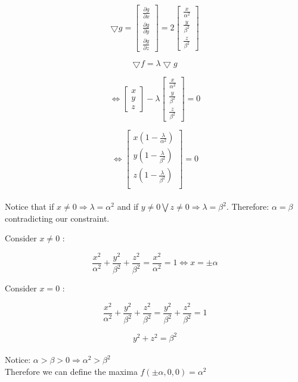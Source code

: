 \documentclass[12pt]{article}
\begin{document}
$$
\bigtriangledown g = 
\begin{bmatrix}
\frac{\partial g}{\partial x} \\
\frac{\partial g}{\partial y} \\
\frac{\partial g}{\partial z} 
\end{bmatrix} = 2
\begin{bmatrix}
\frac{x}{\alpha^2} \\
\frac{y}{\beta^2} \\
\frac{z}{\beta^2}
\end{bmatrix}
 $$

$$
\bigtriangledown f  = \lambda\bigtriangledown g
$$

$$
\iff \begin{bmatrix}
x \\
y \\
z
\end{bmatrix}
- \lambda
\begin{bmatrix}
\frac{x}{\alpha^2} \\
\frac{y}{\beta^2} \\
\frac{z}{\beta^2}
\end{bmatrix}
= 0
 $$
 
$$ \iff
\begin{bmatrix}
x(1 - \frac{\lambda}{\alpha^2} ) \\
y(1 - \frac{\lambda}{\beta^2} ) \\
z(1 - \frac{\lambda}{\beta^2} ) \\
\end{bmatrix}
= 0
 $$ \\

Notice that if $ x \neq 0 \Rightarrow \lambda = \alpha^2$ and if $ y \neq 0 \bigvee  z \neq 0 \Rightarrow \lambda = \beta^2$. Therefore:  $\alpha = \beta$ contradicting our constraint.

Consider $x \neq 0$ :

$$ \frac{x^2}{\alpha^2} + \frac{y^2}{\beta^2} + \frac{z^2}{\beta^2} = \frac{x^2}{\alpha^2} = 1 \iff x = \pm \alpha$$

Consider $x = 0$ :

$$ \frac{x^2}{\alpha^2} + \frac{y^2}{\beta^2} + \frac{z^2}{\beta^2} = 
\frac{y^2}{\beta^2} + \frac{z^2}{\beta^2} = 1$$

$$ y^2 + z^2 = \beta^2 $$ \\ 

Notice: $\alpha > \beta > 0 \Rightarrow \alpha^2 > \beta^2$ \\

Therefore we can define the maxima $f(\pm \alpha,0,0) = \alpha^2 $\\
\end{document}
